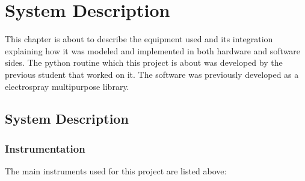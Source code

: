 \chapter[System Description]{System Description}
\label{chap:system_description}

This chapter is about to describe the equipment used and its integration explaining how it was modeled and implemented in both hardware and software sides.
The python routine which this project is about was developed by the previous student that worked on it.\cite{Monica}
The software was previously developed as a electrospray multipurpose library\cite{Monica}. 


\section{System Description}
\label{sec:system_description}

\subsection{Instrumentation}
\label{subsec:instrumentation}

The main instruments used for this project are listed above:

